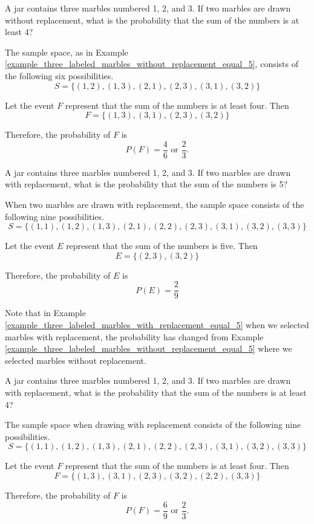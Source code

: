 \begin{example}\label{example_three_labeled_marbles_without_replacement_at_least_4}
    A jar contains three marbles numbered 1, 2, and 3. If two marbles are drawn without replacement, what is the probability that the sum of the numbers is at least 4?
\end{example}
\begin{solution}
    The sample space, as in Example \ref{example_three_labeled_marbles_without_replacement_equal_5}, consists of the following six possibilities.
    \[ S = \{ (1, 2), (1, 3), (2, 1), (2, 3), (3, 1), (3, 2) \} \]

    Let the event \( F \) represent that the sum of the numbers is at least four. Then
    \[ F = \{ (1, 3), (3, 1), (2, 3), (3, 2) \} \]

    Therefore, the probability of \( F \) is
    \[ P(F) = \frac{4}{6} \text{ or } \frac{2}{3}. \]
\end{solution}

\begin{example}\label{example_three_labeled_marbles_with_replacement_equal_5}
    A jar contains three marbles numbered 1, 2, and 3. If two marbles are drawn with replacement, what is the probability that the sum of the numbers is 5?
\end{example}
\begin{solution}
    When two marbles are drawn with replacement, the sample space consists of the following nine possibilities.
    \[ S = \{(1,1), (1, 2), (1, 3), (2, 1), (2, 2), (2, 3), (3, 1), (3, 2), (3,3)\} \]

    Let the event \( E \) represent that the sum of the numbers is five. Then
    \[ E = \{(2, 3), (3, 2)\} \]

    Therefore, the probability of \( E \) is
    \[ P(E) = \frac{2}{9} \]
\end{solution}

Note that in Example \ref{example_three_labeled_marbles_with_replacement_equal_5} when we selected marbles with replacement, the probability has changed from Example \ref{example_three_labeled_marbles_without_replacement_equal_5} where we selected marbles without replacement.

\begin{example}\label{example_three_labeled_marbles_with_replacement_at_least_4}
    A jar contains three marbles numbered 1, 2, and 3. If two marbles are drawn with replacement, what is the probability that the sum of the numbers is at least 4?
\end{example}
\begin{solution}
    The sample space when drawing with replacement consists of the following nine possibilities.
    \[ S = \{(1,1), (1, 2), (1, 3), (2, 1), (2, 2), (2, 3), (3, 1), (3, 2), (3,3)\} \]

    Let the event \( F \) represent that the sum of the numbers is at least four. Then
    \[ F = \{(1, 3), (3, 1), (2, 3), (3, 2), (2,2), (3,3)\} \]

    Therefore, the probability of \( F \) is
    \[ P(F) = \frac{6}{9} \text{ or } \frac{2}{3}. \]
\end{solution}

